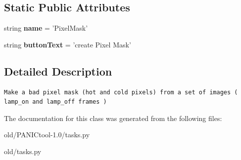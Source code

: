 \subsection*{Static Public Attributes}
\begin{CompactItemize}
\item 
string \textbf{name} = '{\bfcreate\-Pixel\-Mask}'\label{classtasks_1_1createPixelMask_b742c56d9babf3b3721ceb94c6c09916}

\item 
string \textbf{button\-Text} = 'create Pixel Mask'\label{classtasks_1_1createPixelMask_419c33130adc3fa768d65522aec006bc}

\end{CompactItemize}


\subsection{Detailed Description}


\footnotesize\begin{verbatim}Make a bad pixel mask (hot and cold pixels) from a set of images ( lamp_on and lamp_off frames )
\end{verbatim}
\normalsize
 



The documentation for this class was generated from the following files:\begin{CompactItemize}
\item 
old/PANICtool-1.0/tasks.py\item 
old/tasks.py\end{CompactItemize}
